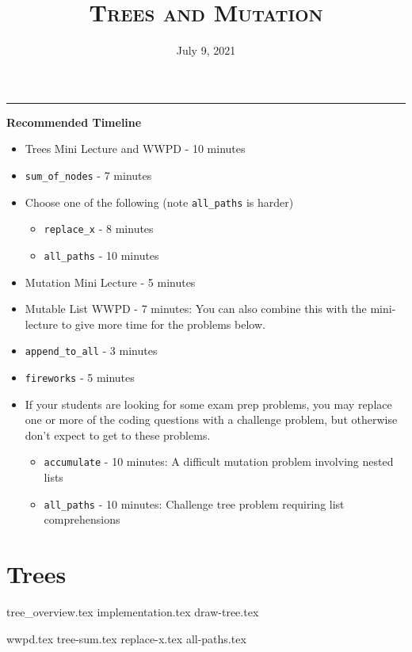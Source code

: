 \documentclass{exam}
\title{\textsc{Trees and Mutation}}
\date{July 9, 2021}
\begin{document}
\maketitle
\rule{\textwidth}{0.15em}
\fontsize{12}{15}\selectfont


\begin{guide}
    \textbf{Recommended Timeline}
    \begin{itemize}
        \item Trees Mini Lecture and WWPD - 10 minutes
        \item \lstinline{sum_of_nodes} - 7 minutes
        \item Choose one of the following (note \lstinline{all_paths} is harder)
            \begin{itemize}
            \item \lstinline{replace_x} - 8 minutes
            \item \lstinline{all_paths} - 10 minutes
            \end{itemize}
        \item Mutation Mini Lecture - 5 minutes
        \item Mutable List WWPD - 7 minutes: You can also combine this with the mini-lecture to give more time for the problems below.
        \item \lstinline{append_to_all} - 3 minutes
        \item \lstinline{fireworks} - 5 minutes
        \item If your students are looking for some exam prep problems, you may replace one or more of the coding questions with a challenge problem, 
        but otherwise don't expect to get to these problems.
            \begin{itemize}
            \item \lstinline{accumulate} - 10 minutes: A difficult mutation problem involving nested lists
            \item \lstinline{all_paths} - 10 minutes: Challenge tree problem requiring list comprehensions
            \end{itemize}
    \end{itemize}
    \vspace{.5cm}
    \newpage
\end{guide}

\section{Trees}
{tree_overview.tex}
{implementation.tex}
{draw-tree.tex}
\vspace{.5cm}
\begin{questions}
{wwpd.tex}
\newpage
{tree-sum.tex}
\newpage
{replace-x.tex}
\newpage
{all-paths.tex}
\end{questions}
\end{document}
